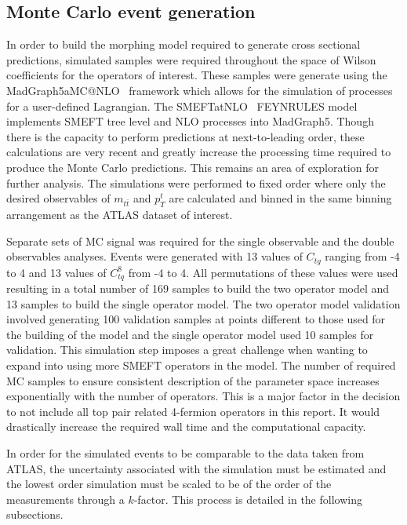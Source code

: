 \documentclass[a4paper,11pt]{article}
\begin{document}
\subsection{Monte Carlo event generation}
In order to build the morphing model required to generate cross sectional predictions, simulated samples were required throughout the space of Wilson coefficients for the operators of interest.
These samples were generate using the MadGraph5\textunderscore aMC@NLO~\cite{Alwall_2014} framework which allows for the simulation of processes for a user-defined Lagrangian.
The SMEFTatNLO~\cite{degrande2020automated} FEYNRULES model implements SMEFT tree level and NLO processes into MadGraph5.
Though there is the capacity to perform predictions at next-to-leading order, these calculations are very recent and greatly increase the processing time required to produce the Monte Carlo predictions.
This remains an area of exploration for further analysis.
The simulations were performed to fixed order where only the desired observables of $m_{t\bar{t}}$ and ${p_{T}^{t}}$ are calculated and binned in the same binning arrangement as the ATLAS dataset of interest.

Separate sets of MC signal was required for the single observable and the double observables analyses.
Events were generated with 13 values of $C_{tg}$ ranging from  -4 to 4 and 13 values of $C_{tq}^{8}$ from -4 to 4.
All permutations of these values were used resulting in a total number of 169 samples to build the two operator model and 13 samples to build the single operator model.
The two operator model validation involved generating 100 validation samples at points different to those used for the building of the model and the single operator model used 10 samples for validation.
This simulation step imposes a great challenge when wanting to expand into using more SMEFT operators in the model.
The number of required MC samples to ensure consistent description of the parameter space increases exponentially with the number of operators.
This is a major factor in the decision to not include all top pair related 4-fermion operators in this report.
It would drastically increase the required wall time and the computational capacity.

In order for the simulated events to be comparable to the data taken from ATLAS, the uncertainty associated with the simulation must be estimated and the lowest order simulation must be scaled to be of the order of the measurements through a $k$-factor.
This process is detailed in the following subsections.
\end{document}
